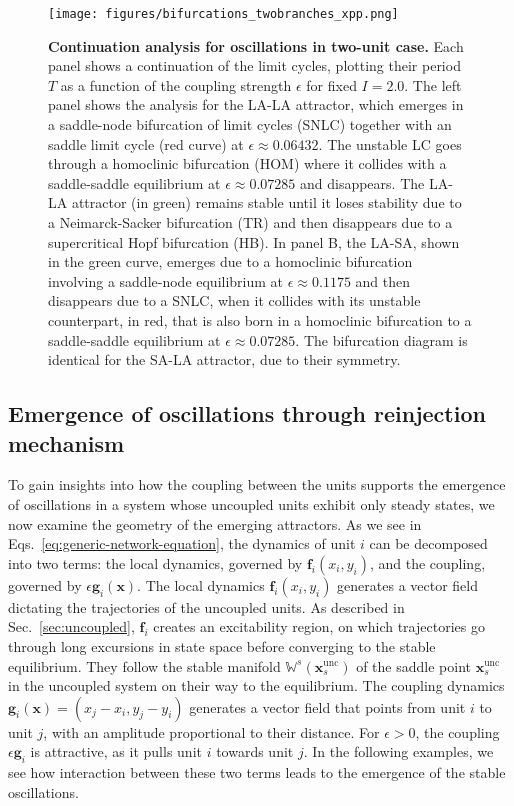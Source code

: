 \begin{figure}[h!]
    \centering
    \texttt{[image: figures/bifurcations\_twobranches\_xpp.png]}
    \caption{\textbf{Continuation analysis for oscillations in two-unit case.} Each panel shows a continuation of the limit cycles, plotting their period $T$ as a function of the coupling strength $\epsilon$ for fixed $I = 2.0$. The left panel shows the analysis for the LA-LA attractor, which emerges in a saddle-node bifurcation of limit cycles (SNLC) together with an saddle limit cycle (red curve) at $\epsilon \approx 0.06432$. The unstable LC goes through a homoclinic bifurcation (HOM) where it collides with a saddle-saddle equilibrium at $\epsilon \approx 0.07285$ and disappears. The LA-LA attractor (in green) remains stable until it loses stability due to a Neimarck-Sacker bifurcation (TR) and then disappears due to a supercritical Hopf bifurcation (HB). In panel B, the LA-SA, shown in the green curve, emerges due to a homoclinic bifurcation involving a saddle-node equilibrium at $\epsilon \approx 0.1175$ and then disappears due to a SNLC, when it collides with its unstable counterpart, in red, that is also born in a homoclinic bifurcation to a saddle-saddle equilibrium at $\epsilon \approx 0.07285$. The bifurcation diagram is identical for the SA-LA attractor, due to their symmetry.}
    \label{fig:bifurcations-2-units}
\end{figure}

\subsection{Emergence of oscillations through reinjection mechanism}\label{sec:geometry}
To gain insights into how the coupling between the units supports the emergence of oscillations in a system whose uncoupled units exhibit only steady states, we now examine the geometry of the emerging attractors. As we see in Eqs.~\ref{eq:generic-network-equation}, the dynamics of unit $i$ can be decomposed into two terms: the local dynamics, governed by $\mathbf{f}_i(x_i,y_i)$, and the coupling, governed by $\epsilon \mathbf{g}_i(\mathbf{x})$. The local dynamics $\mathbf{f}_i(x_i, y_i)$ generates a vector field dictating the trajectories of the uncoupled units. As described in Sec.~\ref{sec:uncoupled}, $\mathbf{f}_i$ creates an excitability region, on which trajectories go through long excursions in state space before converging to the stable equilibrium. They follow the stable manifold $\mathbb{W}^s(\mathbf{x}_s^\mathrm{unc})$ of the saddle point $\mathbf{x}_s^\mathrm{unc}$ in the uncoupled system on their way to the equilibrium. The coupling dynamics $\mathbf{g}_i(\mathbf{x}) = (x_j-x_i, y_j-y_i)$ generates a vector field that points from unit $i$ to unit $j$, with an amplitude proportional to their distance. For $\epsilon > 0$, the coupling $\epsilon \mathbf{g}_i$ is attractive, as it pulls unit $i$ towards unit $j$. In the following examples, we see how interaction between these two terms leads to the emergence of the stable oscillations. 

